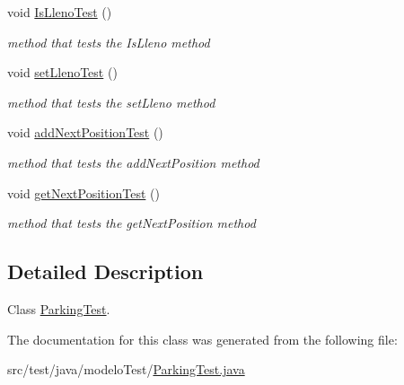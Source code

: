 \begin{DoxyCompactItemize}
void \mbox{\hyperlink{classmodelo_test_1_1_parking_test_aac705e55fd569089a815b3a6f6b37e1c}{Is\+Lleno\+Test}} ()
\begin{DoxyCompactList}\small\item\em method that tests the Is\+Lleno method \end{DoxyCompactList}\item 
\mbox{\label{classmodelo_test_1_1_parking_test_a7e6beea37235da4061ccaac55bd06219}} 
void \mbox{\hyperlink{classmodelo_test_1_1_parking_test_a7e6beea37235da4061ccaac55bd06219}{set\+Lleno\+Test}} ()
\begin{DoxyCompactList}\small\item\em method that tests the set\+Lleno method \end{DoxyCompactList}\item 
\mbox{\label{classmodelo_test_1_1_parking_test_af691006c8fddd1c155b263c6076a43f9}} 
void \mbox{\hyperlink{classmodelo_test_1_1_parking_test_af691006c8fddd1c155b263c6076a43f9}{add\+Next\+Position\+Test}} ()
\begin{DoxyCompactList}\small\item\em method that tests the add\+Next\+Position method \end{DoxyCompactList}\item 
\mbox{\label{classmodelo_test_1_1_parking_test_afc3678f1497b8fb1894838ad3d305d0b}} 
void \mbox{\hyperlink{classmodelo_test_1_1_parking_test_afc3678f1497b8fb1894838ad3d305d0b}{get\+Next\+Position\+Test}} ()
\begin{DoxyCompactList}\small\item\em method that tests the get\+Next\+Position method \end{DoxyCompactList}\end{DoxyCompactItemize}


\subsection{Detailed Description}
Class \mbox{\hyperlink{classmodelo_test_1_1_parking_test}{Parking\+Test}}. 

The documentation for this class was generated from the following file\+:\begin{DoxyCompactItemize}
\item 
src/test/java/modelo\+Test/\mbox{\hyperlink{_parking_test_8java}{Parking\+Test.\+java}}\end{DoxyCompactItemize}
